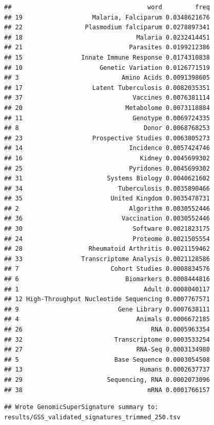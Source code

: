 \documentclass[
]{article}
\begin{document}
\begin{verbatim}
##                                     word         freq
## 19                   Malaria, Falciparum 0.0348621676
## 22                 Plasmodium falciparum 0.0278897341
## 18                               Malaria 0.0232414451
## 21                             Parasites 0.0199212386
## 15                Innate Immune Response 0.0174310838
## 10                     Genetic Variation 0.0126771519
## 3                            Amino Acids 0.0091398605
## 17                   Latent Tuberculosis 0.0082035351
## 37                              Vaccines 0.0076381114
## 20                            Metabolome 0.0073118884
## 11                              Genotype 0.0069724335
## 8                                  Donor 0.0068768253
## 23                   Prospective Studies 0.0063805273
## 14                             Incidence 0.0057424746
## 16                                Kidney 0.0045699302
## 25                             Pyridones 0.0045699302
## 31                       Systems Biology 0.0040621602
## 34                          Tuberculosis 0.0035890466
## 35                        United Kingdom 0.0035478731
## 2                              Algorithm 0.0030552446
## 36                           Vaccination 0.0030552446
## 30                              Software 0.0021823175
## 24                              Proteome 0.0021505554
## 28                  Rheumatoid Arthritis 0.0021159462
## 33                Transcriptome Analysis 0.0021128586
## 7                         Cohort Studies 0.0008834576
## 6                             Biomarkers 0.0008444816
## 1                                  Adult 0.0008040117
## 12 High-Throughput Nucleotide Sequencing 0.0007767571
## 9                           Gene Library 0.0007638111
## 4                                Animals 0.0006672185
## 26                                   RNA 0.0005963354
## 32                         Transcriptome 0.0003533254
## 27                               RNA-Seq 0.0003134980
## 5                          Base Sequence 0.0003054508
## 13                                Humans 0.0002637737
## 29                       Sequencing, RNA 0.0002073096
## 38                                  mRNA 0.0001766157
\end{verbatim}

\begin{verbatim}
## Wrote GenomicSuperSignature summary to: results/GSS_validated_signatures_trimmed_250.tsv
\end{verbatim}
\end{document}
